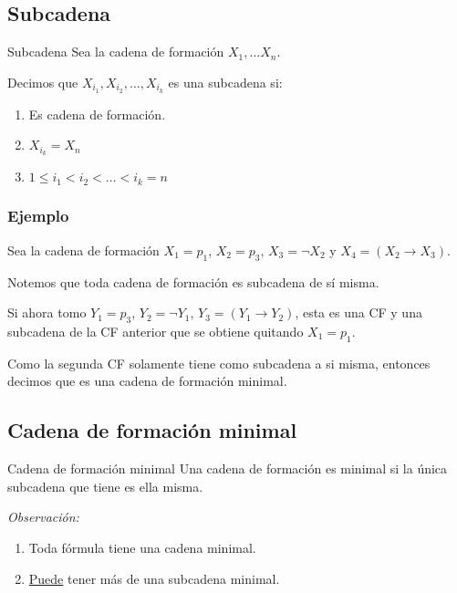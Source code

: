 \subsection{Subcadena}

\begin{definicion}{Subcadena}{}
    Sea la cadena de formación $X_1, \dots X_n$.

    \medskip

    Decimos que
    $X_{i_1}, X_{i_2}, \dotsc, X_{i_k}$ es una subcadena si:
    \begin{enumerate}
        \item Es cadena de formación.
        \item $X_{i_k} = X_n$ %
        \item $1 \leq i_1 < i_2 < \dots < i_k = n$
    \end{enumerate}
\end{definicion}

\subsubsection{Ejemplo}

Sea la cadena de formación $X_1 = p_1$, $X_2 = p_3$, $X_3 = \neg X_2$ y
$X_4 = (X_2 \to X_3)$.

Notemos que toda cadena de formación es subcadena de sí misma.

Si ahora tomo $Y_1 = p_3$, $Y_2 = \neg Y_1$, $Y_3 = (Y_1 \to Y_2)$, esta es
una CF y una subcadena de la CF anterior que se obtiene quitando $X_1 = p_1$.

Como la segunda CF solamente tiene como subcadena a si misma, entonces decimos
que es una cadena de formación minimal.


\subsection{Cadena de formación minimal}

\begin{definicion}{Cadena de formación minimal}{}
        Una cadena de formación es minimal si la única subcadena que tiene es ella misma.
\end{definicion}

\medskip
\textit{Observación:}
\begin{enumerate}
    \item Toda fórmula tiene una cadena minimal.
    \item {}%
    \underline{Puede} tener más de una subcadena minimal. 
\end{enumerate}


